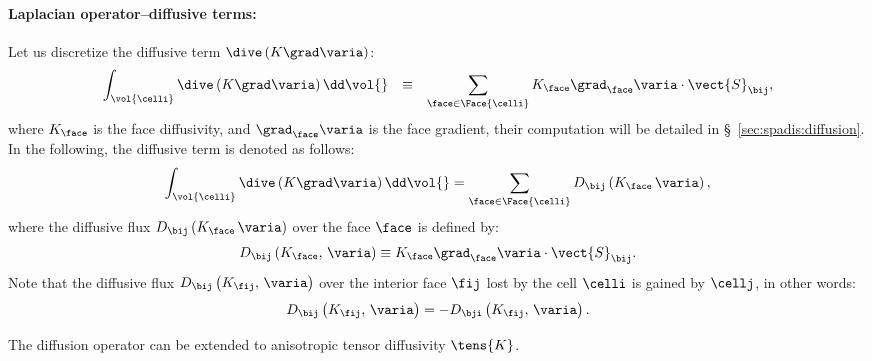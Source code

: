 \paragraph{Laplacian operator--diffusive terms:}
Let us discretize the diffusive term $\dive \left(  K \grad \varia  \right) $:
%
 \begin{equation}\label{eq:spadis:diffusion_def}
 \begin{array}{r c l}
\displaystyle \int_{\vol{\celli}} \dive \left( K \grad \varia\right) \dd \vol{} &\equiv &
\displaystyle \sum_{\face \in \Face{\celli}} K_\face \grad_\face \varia \cdot \vect{S}_{\bij},
 \end{array}
 \end{equation}
  where $K_\face$ is the face diffusivity, and $\grad_\face \varia$ is the face gradient, their computation will be detailed in \S~\ref{sec:spadis:diffusion}. In the following, the diffusive term is denoted as follows:
\begin{equation}\label{eq:spadis:diffusion_notation}
\int_{\vol{\celli}} \dive \left( K \grad \varia\right) \dd \vol{}
 =
\sum_{\face \in \Face{\celli}} D_{\bij} \left(  K_\face \,  \varia \right),
\end{equation}
 where the diffusive flux $D_{\bij} \left(  K_\face \,  \varia \right)$ over the face $\face$ is defined by:
 \begin{equation}\label{eq:spadis:diffusion_flux}
D_{\bij} \left( K_\face , \, \varia\right) \equiv   K_\face \grad_\face \varia \cdot \vect{S}_{\bij}.
 \end{equation}
 Note that the diffusive flux $D_{\bij} \left( K_\fij , \, \varia\right) $ over the interior face $\fij$ lost by the cell $\celli$
 is gained by $\cellj$, in other words:
 \begin{equation}\label{eq:spadis:diffusion_flux_symmetry}
D_{\bij} \left( K_\fij , \, \varia\right) = - D_{\bji} \left( K_\fij , \, \varia\right) .
 \end{equation}

 \begin{remark}
The diffusion operator can be extended to anisotropic tensor diffusivity $\tens{K}$.
 \end{remark}

